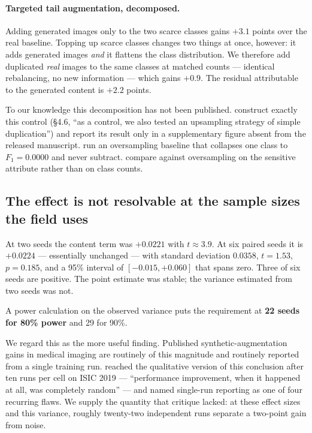 \documentclass[11pt]{article}
\begin{document}
\paragraph{Targeted tail augmentation, decomposed.} Adding generated images only to the two
scarce classes gains $+3.1$ points over the real baseline. Topping up scarce classes changes
two things at once, however: it adds generated images \emph{and} it flattens the class
distribution. We therefore add duplicated \emph{real} images to the same classes at matched
counts --- identical rebalancing, no new information --- which gains $+0.9$. The residual
attributable to the generated content is $+2.2$ points.

To our knowledge this decomposition has not been published. \citet{sagers2023} construct
exactly this control (\S4.6, ``as a control, we also tested an upsampling strategy of simple
duplication'') and report its result only in a supplementary figure absent from the released
manuscript. \citet{schaudt2023} run an oversampling baseline that collapses one class to
$F_1 = 0.0000$ and never subtract. \citet{ktena2024} compare against oversampling on the
sensitive attribute rather than on class counts.

\subsection{The effect is not resolvable at the sample sizes the field uses}
\label{sec:power}

At two seeds the content term was $+0.0221$ with $t \approx 3.9$. At six paired seeds it is
$+0.0224$ --- essentially unchanged --- with standard deviation $0.0358$, $t = 1.53$,
$p = 0.185$, and a 95\% interval of $[-0.015, +0.060]$ that spans zero. Three of six seeds
are positive. The point estimate was stable; the variance estimated from two seeds was not.

A power calculation on the observed variance puts the requirement at \textbf{22 seeds for
80\% power} and 29 for 90\%.

We regard this as the more useful finding. Published synthetic-augmentation gains in medical
imaging are routinely of this magnitude and routinely reported from a single training run.
\citet{bissoto2021} reached the qualitative version of this conclusion after ten runs per
cell on ISIC 2019 --- ``performance improvement, when it happened at all, was completely
random'' --- and named single-run reporting as one of four recurring flaws. We supply the
quantity that critique lacked: at these effect sizes and this variance, roughly twenty-two
independent runs separate a two-point gain from noise.
\end{document}
